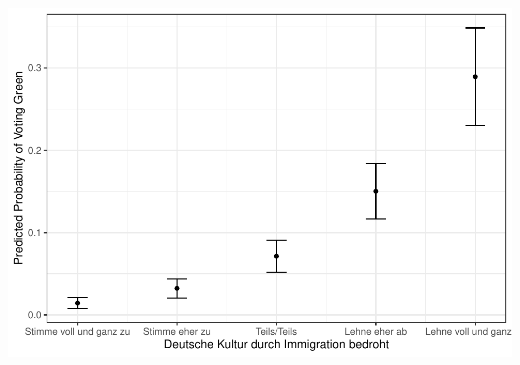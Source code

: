 \documentclass[
]{article}
\begin{document}
\includegraphics{AVCD_Final_Assignment-Edenhofer_files/figure-latex/gruene-immig-culture-threat-1.pdf}
\end{document}
